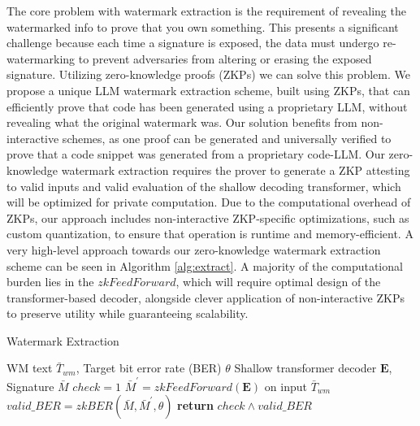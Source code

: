 The core problem with watermark extraction is the requirement of revealing the watermarked info to prove that you own something. This presents a significant challenge because each time a signature is exposed, the data must undergo re-watermarking to prevent adversaries from altering or erasing the exposed signature. Utilizing zero-knowledge proofs (ZKPs) we can solve this problem. We propose a unique LLM watermark extraction scheme, built using ZKPs, that can efficiently prove that code has been generated using a proprietary LLM, without revealing what the original watermark was. Our solution benefits from non-interactive schemes, as one proof can be generated and universally verified to prove that a code snippet was generated from a proprietary code-LLM. Our zero-knowledge watermark extraction requires the prover to generate a ZKP attesting to valid inputs and valid evaluation of the shallow decoding transformer, which will be optimized for private computation. Due to the computational overhead of ZKPs, our approach includes non-interactive ZKP-specific optimizations, such as custom quantization, to ensure that operation is runtime and memory-efficient. A very high-level approach towards our zero-knowledge watermark extraction scheme can be seen in Algorithm \ref{alg:extract}. A majority of the computational burden lies in the $zkFeedForward$, which will require optimal design of the transformer-based decoder, alongside clever application of non-interactive ZKPs to preserve utility while guaranteeing scalability.

\begin{algorithm}[h]
\small
\caption{Watermark Extraction}
\label{alg:extract}
\begin{algorithmic} [1]
     WM text $\bar{T}_{wm}$, Target bit error rate (BER) $\theta$
     Shallow transformer decoder $\mathbf{E}$, Signature $\bar{M}$
    \State \hspace{1em} $check=1$
    \State \hspace{1em} $\bar{M}^\prime = zkFeedForward(\mathbf{E})$ on input $\bar{T}_{wm}$
    \State \hspace{1em} $valid\_BER = zkBER(\bar{M}, \bar{M}^\prime, \theta)$ 
    \State \hspace*{1em}  \textbf{return} $check \land valid\_BER$
    
\end{algorithmic}
\end{algorithm}

